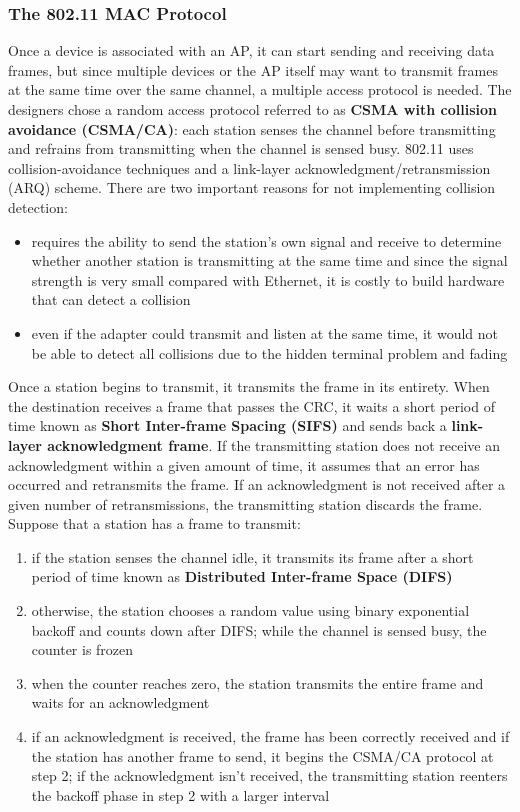\documentclass{article}
\begin{document}
\subsubsection{The 802.11 MAC Protocol}
Once a device is associated with an AP, it can start sending and receiving data frames, but since multiple devices or the AP itself may want to transmit frames at the same time over the same channel, a multiple access protocol is needed.
The designers chose a random access protocol referred to as \textbf{CSMA with collision avoidance (CSMA/CA)}: each station senses the channel before transmitting and refrains from transmitting when the channel is sensed busy.
802.11 uses collision-avoidance techniques and a link-layer acknowledgment/retransmission (ARQ) scheme.
There are two important reasons for not implementing collision detection:
\begin{itemize}
    \item requires the ability to send the station’s own signal and receive to determine whether another station is transmitting at the same time and since the signal strength is very small compared with Ethernet, it is costly to build hardware that can detect a collision 
    \item even if the adapter could transmit and listen at the same time, it would not be able to detect all collisions due to the hidden terminal problem and fading
\end{itemize}
Once a station begins to transmit, it transmits the frame in its entirety.
When the destination receives a frame that passes the CRC, it waits a short period of time known as \textbf{Short Inter-frame Spacing (SIFS)} and sends back a \textbf{link-layer acknowledgment frame}.
If the transmitting station does not receive an acknowledgment within a given amount of time, it assumes that an error has occurred and retransmits the frame.
If an acknowledgment is not received after a given number of retransmissions, the transmitting station discards the frame. 
Suppose that a station has a frame to transmit:
\begin{enumerate}
    \item if the station senses the channel idle, it transmits its frame after a short period of time known as \textbf{Distributed Inter-frame Space (DIFS)}
    \item otherwise, the station chooses a random value using binary exponential backoff and counts down after DIFS; while the channel is sensed busy, the counter is frozen
    \item when the counter reaches zero, the station transmits the entire frame and waits for an acknowledgment
    \item if an acknowledgment is received, the frame has been correctly received and if the station has another frame to send, it begins the CSMA/CA protocol at step 2; if the acknowledgment isn’t received, the transmitting station reenters the backoff phase in step 2 with a larger interval
\end{enumerate}
\end{document}
